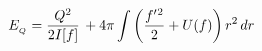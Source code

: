 \begin{equation}
E_{_{{\tiny Q}}}=\frac{Q^{2}}{2I[f]}\,+4\pi \int \left(
\frac{f^{\prime }{}^{2}}{2}+U(f)\right) r^{2}\,dr  \label{ene}
\end{equation}

